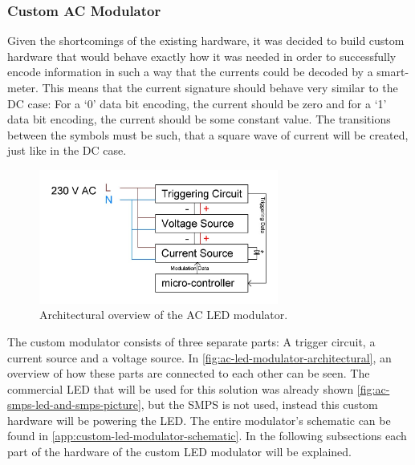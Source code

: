 
\subsubsection{Custom AC Modulator}






Given the shortcomings of the existing hardware, it was decided to build custom hardware that would behave exactly how it was needed in order to successfully encode information in such a way that the currents could be decoded by a smart-meter.
This means that the current signature should behave very similar to the DC case: For a `0' data bit encoding, the current should be zero and for a `1' data bit encoding, the current should be some constant value.
The transitions between the symbols must be such, that a square wave of current will be created, just like in the DC case. 

\begin{figure}[h]
	\centering
	\includegraphics[angle=0,width=0.7\textwidth]{chapters/hardware-chapters/AC/ac-modulator/custom-hardware/ac-modulator-architectural.JPG}
	\caption{Architectural overview of the AC LED modulator.}
	\label{fig:ac-led-modulator-architectural}
\end{figure}

The custom modulator consists of three separate parts: A trigger circuit, a current source and a voltage source.
In \autoref{fig:ac-led-modulator-architectural}, an overview of how these parts are connected to each other can be seen.
The commercial LED that will be used for this solution was already shown \autoref{fig:ac-smps-led-and-smps-picture}, but the SMPS is not used, instead this custom hardware will be powering the LED. 
The entire modulator's schematic can be found in \autoref{app:custom-led-modulator-schematic}.
In the following subsections each part of the hardware of the custom LED modulator will be explained.



